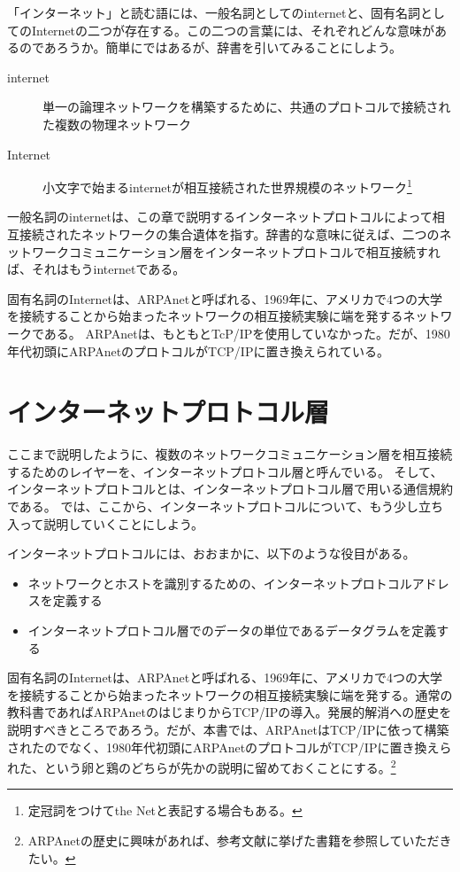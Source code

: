 「インターネット」と読む語には、一般名詞としてのinternetと、固有名詞としてのInternetの二つが存在する。この二つの言葉には、それぞれどんな意味があるのであろうか。簡単にではあるが、辞書を引いてみることにしよう。

\begin{description}
\item[internet]単一の論理ネットワークを構築するために、共通のプロトコルで接続された複数の物理ネットワーク
\item[Internet]小文字で始まるinternetが相互接続された世界規模のネットワーク\footnote{定冠詞をつけてthe Netと表記する場合もある。}
\end{description}

一般名詞のinternetは、この章で説明するインターネットプロトコルによって相互接続されたネットワークの集合遺体を指す。辞書的な意味に従えば、二つのネットワークコミュニケーション層をインターネットプロトコルで相互接続すれば、それはもうinternetである。

固有名詞のInternetは、ARPAnetと呼ばれる、1969年に、アメリカで4つの大学を接続することから始まったネットワークの相互接続実験に端を発するネットワークである。
ARPAnetは、もともとTcP/IPを使用していなかった。だが、1980年代初頭にARPAnetのプロトコルがTCP/IPに置き換えられている。

\section{インターネットプロトコル層}

ここまで説明したように、複数のネットワークコミュニケーション層を相互接続するためのレイヤーを、インターネットプロトコル層と呼んでいる。
そして、インターネットプロトコルとは、インターネットプロトコル層で用いる通信規約である。
では、ここから、インターネットプロトコルについて、もう少し立ち入って説明していくことにしよう。

インターネットプロトコルには、おおまかに、以下のような役目がある。

\begin{itemize}
\item ネットワークとホストを識別するための、インターネットプロトコルアドレスを定義する 
\item インターネットプロトコル層でのデータの単位であるデータグラムを定義する 
\end{itemize}

固有名詞のInternetは、ARPAnetと呼ばれる、1969年に、アメリカで4つの大学を接続することから始まったネットワークの相互接続実験に端を発する。通常の教科書であればARPAnetのはじまりからTCP/IPの導入。発展的解消への歴史を説明すべきところであろう。だが、本書では、ARPAnetはTCP/IPに依って構築されたのでなく、1980年代初頭にARPAnetのプロトコルがTCP/IPに置き換えられた、という卵と鶏のどちらが先かの説明に留めておくことにする。\footnote{ARPAnetの歴史に興味があれば、参考文献に挙げた書籍を参照していただきたい。}





